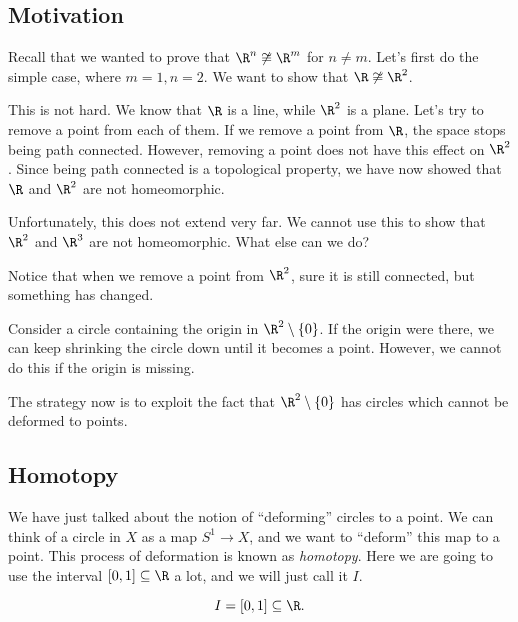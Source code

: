 \documentclass[a4paper]{article}
\begin{document}
\setcounter{subsection}{-1}
\subsection{Motivation}
Recall that we wanted to prove that $\R^n \not\cong \R^m$ for $n\not= m$. Let's first do the simple case, where $m = 1, n = 2$. We want to show that $\R\not\cong \R^2$.

This is not hard. We know that $\R$ is a line, while $\R^2$ is a plane. Let's try to remove a point from each of them.  If we remove a point from $\R$, the space stops being path connected. However, removing a point does not have this effect on $\R^2$. Since being path connected is a topological property, we have now showed that $\R$ and $\R^2$ are not homeomorphic.

Unfortunately, this does not extend very far. We cannot use this to show that $\R^2$ and $\R^3$ are not homeomorphic. What else can we do?

Notice that when we remove a point from $\R^2$, sure it is still connected, but something has changed.

Consider a circle containing the origin in $\R^2 \setminus \{0\}$. If the origin were there, we can keep shrinking the circle down until it becomes a point. However, we cannot do this if the origin is missing.
\begin{center}
\end{center}
The strategy now is to exploit the fact that $\R^2 \setminus \{0\}$ has circles which cannot be deformed to points.

\subsection{Homotopy}
We have just talked about the notion of ``deforming'' circles to a point. We can think of a circle in $X$ as a map $S^1 \to X$, and we want to ``deform'' this map to a point. This process of deformation is known as \emph{homotopy}. Here we are going to use the interval $[0, 1]\subseteq \R $ a lot, and we will just call it $I$.
\begin{notation}
  \[
    I = [0, 1]\subseteq \R.
  \]
\end{notation}
\end{document}
